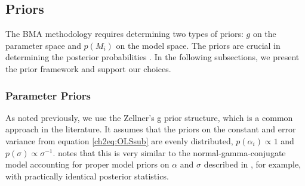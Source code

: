 \begin{refsection}
\subsection{Priors} \label{ch2sec:priors}
The \ac{BMA} methodology requires determining two types of priors: $g$ on the parameter space and $p(M_{i})$ on the model space. The priors are crucial in determining the posterior probabilities \parencite{FeldkircherZeugner2009,CicconeJarocinski2010,Liangetal2008}. In the following subsections, we present the prior framework and support our choices.

\subsubsection{Parameter Priors}
As noted previously, we use the Zellner's g prior structure, which is a common approach in the literature. It assumes that the priors on the constant and error variance from equation \ref{ch2eq:OLSsub} are evenly distributed, $p(\alpha_{i}) \propto 1$ and $p(\sigma) \propto \sigma^{-1}$. \textcite{Zeugner2011} notes that this is very similar to the normal-gamma-conjugate model accounting for proper model priors on $\alpha$ and $\sigma$ described in \textcite{Koop2003}, for example, with practically identical posterior statistics. 


\end{refsection}
